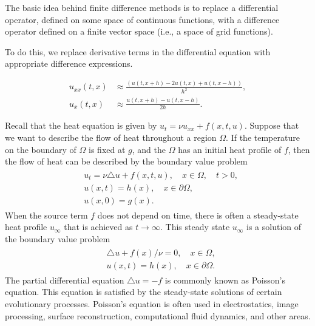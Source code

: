 \label{lab:finitedifference2}

 The basic idea behind finite difference methods is to replace a 
 differential operator, defined on some space of continuous functions, with a 
 difference operator defined on a finite vector space (i.e., a space of grid functions).
 
 To do this, we replace derivative terms in the differential equation with 
 appropriate difference expressions. 
 
 \begin{align*}
 	u_{xx}(t,x) &\approx \frac{(u(t,x+h)- 2u(t,x) + u(t,x-h))}{h^2},\\
 	u_x(t,x) & \approx \frac{u(t,x+h)-u(t,x-h)}{2h}.
 \end{align*}

Recall that the heat equation is given by $u_t = \nu u_{xx} + f(x,t,u)$. Suppose that we want to describe the flow of heat throughout a region $\Omega$. If the temperature on the boundary of $\Omega$ is fixed at $g$, and the $\Omega$ has an initial heat profile of $f$, then the flow of heat can be described by the boundary value problem 
\begin{align}
	\begin{split}
		& { } u_t = \nu \triangle u + f(x,t,u), \quad x \in \Omega, \quad t >0,\\
		& { }u(x,t) = h(x), \quad x \in \partial \Omega, \\
		& { }u(x,0) = g(x).
	\end{split}
\end{align}
When the source term $f$ does not depend on time, there is often a steady-state heat profile $u_{\infty}$ that is achieved as $t \to \infty$. This steady state $u_{\infty}$ is a solution of the boundary value problem 
\begin{align}
	\begin{split}
		& { }  \triangle u + f(x)/\nu = 0, \quad x \in \Omega,\\
		& { }u(x,t) = h(x), \quad x \in \partial \Omega.
	\end{split}
\end{align}
The partial differential equation $\triangle u = -f$ is commonly known as Poisson's equation. This equation is satisfied by the steady-state solutions of certain evolutionary processes. Poisson's equation is often used in electrostatics, image processing, surface reconstruction, computational fluid dynamics, and other areas. 

